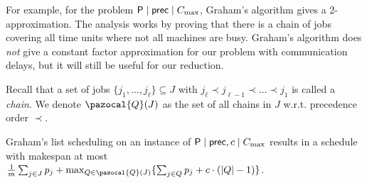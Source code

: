 For example, for the problem $\mathsf{P} \mid \mathsf{prec} \mid C_{\max}$, Graham's algorithm gives a 2-approximation.
The analysis works by proving that there is a chain of jobs covering all time units where not all machines are busy.
Graham's algorithm does \emph{not} give a constant factor approximation for our problem with communication delays,
but it will still be useful for our reduction.



Recall that a set of jobs $\{j_1,\ldots,j_{\ell} \} \subseteq J$ with $j_{\ell} \prec j_{\ell -1} \prec \ldots \prec j_{1}$ is called a \emph{chain}.
We denote  $\pazocal{Q}(J)$ as the set of all chains in $J$ w.r.t. precedence order $\prec$.
\begin{lemma}
	\label{lem:GrahamListScheduling}
  Graham's list scheduling on an instance of $\mathsf{P} \mid \mathsf{prec}, c \mid C_{\max}$
  results in a schedule with makespan at most
  $\frac{1}{m} \sum_{j\in J}p_j+\max_{Q \in \pazocal{Q}(J)}\{\sum_{j \in Q}p_j+c\cdot (|Q|-1) \}$.
\end{lemma}

